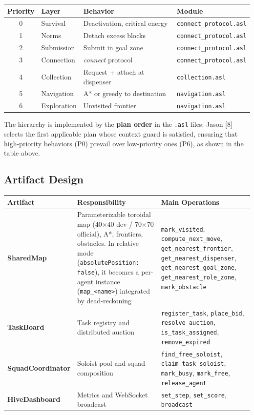 \documentclass[11pt,a4paper]{article}
\newcommand{\code}[1]{\texttt{#1}}
\begin{document}
\begin{table}[H]
\centering
\footnotesize
\begin{tabularx}{\linewidth}{c l X l}
\toprule
\textbf{Priority} & \textbf{Layer} & \textbf{Behavior} & \textbf{Module} \\
\midrule
0 & Survival & Deactivation, critical energy & \code{connect\_protocol.asl} \\
1 & Norms & Detach excess blocks & \code{connect\_protocol.asl} \\
2 & Submission & Submit in goal zone & \code{connect\_protocol.asl} \\
3 & Connection & \emph{connect} protocol & \code{connect\_protocol.asl} \\
4 & Collection & Request + attach at dispenser & \code{collection.asl} \\
5 & Navigation & A* or greedy to destination & \code{navigation.asl} \\
6 & Exploration & Unvisited frontier & \code{navigation.asl} \\
\bottomrule
\end{tabularx}
\end{table}

The hierarchy is implemented by the \textbf{plan order} in the \code{.asl} files: Jason [8] selects the first applicable plan whose context guard is satisfied, ensuring that high-priority behaviors (P0) prevail over low-priority ones (P6), as shown in the table above.

\subsection{Artifact Design}
\begin{table}[H]
\centering
\footnotesize
\begin{tabularx}{\linewidth}{l X X}
\toprule
\textbf{Artifact} & \textbf{Responsibility} & \textbf{Main Operations} \\
\midrule
\textbf{SharedMap} & Parameterizable toroidal map (40$\times$40 dev / 70$\times$70 official), A*, frontiers, obstacles. In relative mode (\code{absolutePosition: false}), it becomes a per-agent instance (\code{map\_<name>}) integrated by dead-reckoning & \code{mark\_visited}, \code{compute\_next\_move}, \code{get\_nearest\_frontier}, \code{get\_nearest\_dispenser}, \code{get\_nearest\_goal\_zone}, \code{get\_nearest\_role\_zone}, \code{mark\_obstacle} \\
\textbf{TaskBoard} & Task registry and distributed auction & \code{register\_task}, \code{place\_bid}, \code{resolve\_auction}, \code{is\_task\_assigned}, \code{remove\_expired} \\
\textbf{SquadCoordinator} & Soloist pool and squad composition & \code{find\_free\_soloist}, \code{claim\_task\_soloist}, \code{mark\_busy}, \code{mark\_free}, \code{release\_agent} \\
\textbf{HiveDashboard} & Metrics and WebSocket broadcast & \code{set\_step}, \code{set\_score}, \code{broadcast} \\
\bottomrule
\end{tabularx}
\end{table}
\end{document}
